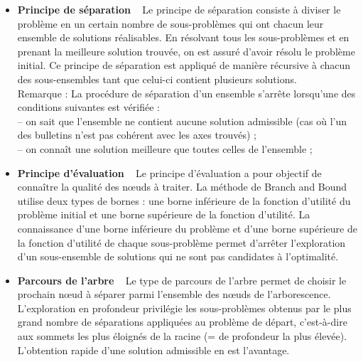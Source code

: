 \documentclass[12pt]{article}
\begin{document}
\begin{itemize}

\item \textbf{Principe de s\'{e}paration} ~ Le principe de s\'{e}paration consiste \`{a} diviser le probl\`{e}me en un certain nombre de sous-probl\`{e}mes qui ont chacun leur ensemble de solutions r\'{e}alisables. En r\'{e}solvant tous les sous-probl\`{e}mes et en prenant la meilleure solution trouv\'{e}e, on est assur\'{e} d'avoir r\'{e}solu le probl\`{e}me initial. Ce principe de s\'{e}paration est appliqu\'{e} de mani\`{e}re r\'{e}cursive \`{a} chacun des sous-ensembles tant que celui-ci contient plusieurs solutions. \\
Remarque : La proc\'{e}dure de s\'{e}paration d'un ensemble s'arr\^{e}te lorsqu'une des conditions
suivantes est v\'{e}rifi\'{e}e : \\
-- on sait que l'ensemble ne contient aucune solution admissible (cas o\`{u} l'un des bulletins n'est pas coh\'{e}rent avec les axes trouv\'{e}s) ; \\
-- on conna\^{i}t une solution meilleure que toutes celles de l'ensemble ; \\

\item \textbf{Principe d'\'{e}valuation} ~  Le principe d'\'{e}valuation a pour objectif de conna\^{i}tre la qualit\'{e} des n\oe{}uds \`{a} traiter. La m\'{e}thode de \og Branch and Bound \fg{} utilise deux types de bornes : une borne inf\'{e}rieure de la fonction d'utilit\'{e} du probl\`{e}me initial et une borne sup\'{e}rieure de la fonction d'utilit\'{e}. La connaissance d'une borne inf\'{e}rieure du probl\`{e}me et d'une borne sup\'{e}rieure de la fonction d'utilit\'{e} de chaque sous-probl\`{e}me permet d'arr\^{e}ter  l'exploration d'un sous-ensemble de
solutions qui ne sont pas candidates \`{a} l'optimalit\'{e}. \\

\item \textbf{Parcours de l'arbre} ~ Le type de parcours de l'arbre permet de choisir le prochain n\oe{}ud \`{a} s\'{e}parer parmi l'ensemble des n\oe{}uds de l'arborescence. L'exploration en profondeur privil\'{e}gie les sous-probl\`{e}mes obtenus par le plus grand nombre de s\'{e}parations appliqu\'{e}es au probl\`{e}me de d\'{e}part, c'est-\`{a}-dire aux sommets les plus \'{e}loign\'{e}s de la racine (= de profondeur la plus \'{e}lev\'{e}e). L'obtention rapide d'une solution admissible en est l'avantage.

\end{itemize}
\end{document}
